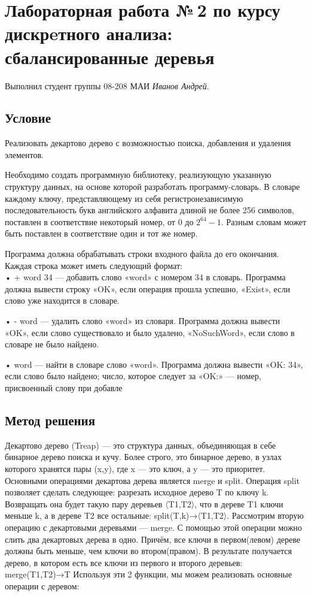 \documentclass[12pt]{article}
\begin{document}
\section*{Лабораторная работа №\,2 по курсу дискрeтного анализа: сбалансированные деревья}

Выполнил студент группы 08-208 МАИ \textit{Иванов Андрей}.

\subsection*{Условие}


Реализовать декартово дерево с возможностью поиска, добавления и удаления элементов.

Необходимо создать программную библиотеку, реализующую указанную структуру данных, на основе которой разработать программу-словарь. В словаре каждому ключу, представляющему из себя регистронезависимую последовательность букв английского алфавита длиной не более 256 символов, поставлен в соответствие некоторый номер, от 0 до $2^{64} - 1$. Разным словам может быть поставлен в соответствие один и тот же номер.

Программа должна обрабатывать строки входного файла до его окончания. Каждая строка может иметь следующий формат: \\

• + word 34 — добавить слово «word» с номером 34 в словарь. Программа должна вывести строку «OK», если операция прошла успешно, «Exist», если слово уже находится в словаре.

• - word — удалить слово «word» из словаря. Программа должна вывести «OK», если слово существовало и было удалено, «NoSuchWord», если слово в словаре не было найдено.

• word — найти в словаре слово «word». Программа должна вывести «OK: 34», если слово было найдено; число, которое следует за «OK:» — номер, присвоенный слову при добавле



\subsection*{Метод решения}

Декартово дерево (Treap) — это структура данных, объединяющая в себе бинарное
дерево поиска и кучу. Более строго, это бинарное дерево, в узлах которого хранятся
пары (x,y), где x — это ключ, а y — это приоритет. Основными операциями декартова
дерева является merge и split.
Операция split позволяет сделать следующее: разрезать исходное дерево T по ключу k.
Возвращать она будет такую пару деревьев 〈T1,T2〉, что в дереве T1 ключи меньше k,
а в дереве T2 все остальные: split(T,k)→〈T1,T2〉.
Рассмотрим вторую операцию с декартовыми деревьями — merge. С помощью этой
операции можно слить два декартовых дерева в одно. Причём, все ключи в первом(левом)
дереве должны быть меньше, чем ключи во втором(правом). В результате получается
дерево, в котором есть все ключи из первого и второго деревьев: merge(T1,T2)→T
Используя эти 2 функции, мы можем реализовать основные операции с деревом:\\
\end{document}
